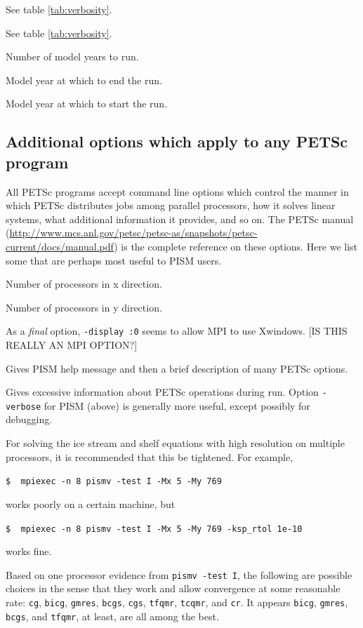 \documentclass[12pt,final]{amsart}
\renewcommand{\t}[1]{\texttt{#1}}
\begin{document}
   See table \ref{tab:verbosity}.

   See table \ref{tab:verbosity}.

 Number of model years to run.

 Model year at which to end the run.

 Model year at which to start the run.


\subsection{Additional options which apply to any PETSc program}  All PETSc programs accept command line options which control the manner in which PETSc distributes jobs among parallel processors, how it solves linear systems, what additional information it provides, and so on.  The PETSc manual (\url{http://www.mcs.anl.gov/petsc/petsc-as/snapshots/petsc-current/docs/manual.pdf}) is the complete reference on these options.  Here we list some that are perhaps most useful to PISM users.

  Number of processors in x direction.

  Number of processors in y direction.

  As a \emph{final} option, \verb|-display :0| seems to allow MPI to use Xwindows.  [IS THIS REALLY AN MPI OPTION?]

  Gives PISM help message and then a brief description of many PETSc options.

  Gives excessive information about PETSc operations during run.  Option \verb|-verbose| for PISM (above) is generally more useful, except possibly for debugging.

  For solving the ice stream and shelf equations with high resolution on multiple processors, it is recommended that this be tightened.  For example, 

\verb|$  mpiexec -n 8 pismv -test I -Mx 5 -My 769|

\noindent works poorly on a certain machine, but

\verb|$  mpiexec -n 8 pismv -test I -Mx 5 -My 769 -ksp_rtol 1e-10|

\noindent works fine.

  Based on one processor evidence from \verb|pismv -test I|, the following are possible choices in the sense that they work and allow convergence at some reasonable rate: \t{cg}, \t{bicg}, \t{gmres}, \t{bcgs}, \t{cgs}, \t{tfqmr}, \t{tcqmr}, and \t{cr}.  It appears \t{bicg}, \t{gmres}, \t{bcgs}, and \t{tfqmr}, at least, are all among the best.
\end{document}
